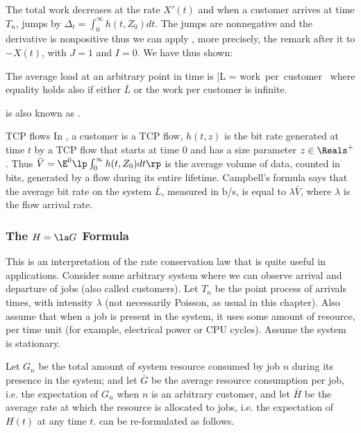 The total work decreases at the rate $X'(t)$ and
when a customer arrives at time $T_n$, jumps by
$\Delta_t= \int_0^{\infty} h(t,Z_0) dt$. The
jumps are nonnegative and the derivative is
nonpositive thus we can apply ,
more precisely, the remark after it to $-X(t)$,
with $J=1$ and $I=0$. We have thus shown:
\begin{shadethm}  The average load at an arbitrary point in time is
\be
 \bar{L} = \la \times \mbox{work per customer }
 \label{eq-shot-noise}
\ee \label{theo-shot-noise} where equality holds
also if either $\bar{L}$ or the work per customer
is infinite.
\end{shadethm}
 is also known as .

\begin{ex}{TCP flows} In \cite{barakat2003mib}, a customer is a TCP flow, $h(t,z)$ is the bit rate generated at
time $t$ by a TCP flow that starts at time $0$ and has a size
parameter $z\in \Reals^+$. Thus $\bar{V}=\E^0\lp
 \int_0^{\infty} h(t,Z_0) dt\rp$ is the average volume of data, counted in bits,
  generated by a flow during its entire lifetime.
Campbell's formula says that the average bit rate on the system
$\bar{L}$, measured in b/s, is equal to $\lambda\bar{V}$, where
$\lambda$ is the flow arrival rate.
\end{ex}



\subsubsection{The $H=\la G$ Formula} This is an interpretation of
the rate conservation law that is quite useful in
applications. Consider some arbitrary system
where we can observe arrival and departure of
jobs (also called customers). Let $T_n$ be the
point process of arrivals times, with intensity
$\lambda$ (not necessarily Poisson, as usual in
this chapter). Also assume that when a job is
present in the system, it uses some amount of
resource, per time unit (for example, electrical
power or CPU cycles). Assume the system is
stationary.

Let $G_n$ be the total amount of system resource
consumed by job $n$ during its presence in the
system; and let $\bar{G}$ be the average resource
consumption per job, i.e. the expectation of
$G_n$ when $n$ is an arbitrary customer, and let
$\bar{H}$ be the average rate at which the
resource is allocated to jobs, i.e. the
expectation of $H(t)$ at any time $t$.
 can be re-formulated as
follows.


